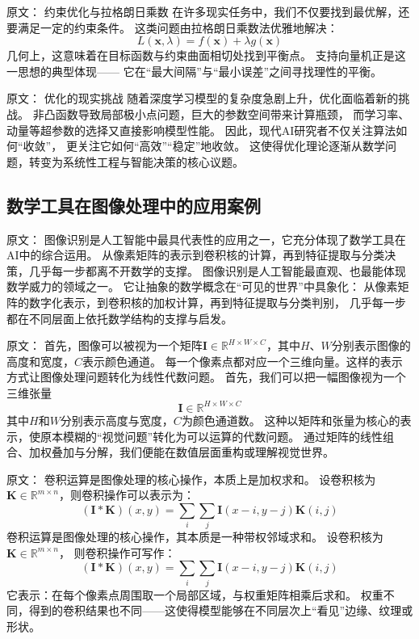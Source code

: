 原文：
约束优化与拉格朗日乘数
在许多现实任务中，我们不仅要找到最优解，还要满足一定的约束条件。  
这类问题由拉格朗日乘数法优雅地解决：
$$L(\mathbf{x}, \lambda) = f(\mathbf{x}) + \lambda g(\mathbf{x})$$  
几何上，这意味着在目标函数与约束曲面相切处找到平衡点。  
支持向量机正是这一思想的典型体现——  
它在“最大间隔”与“最小误差”之间寻找理性的平衡。



原文：
优化的现实挑战
随着深度学习模型的复杂度急剧上升，优化面临着新的挑战。  
非凸函数导致局部极小点问题，巨大的参数空间带来计算瓶颈，  
而学习率、动量等超参数的选择又直接影响模型性能。  
因此，现代AI研究者不仅关注算法如何“收敛”，  
更关注它如何“高效”“稳定”地收敛。  
这使得优化理论逐渐从数学问题，转变为系统性工程与智能决策的核心议题。


\subsection{数学工具在图像处理中的应用案例}

原文：
图像识别是人工智能中最具代表性的应用之一，它充分体现了数学工具在AI中的综合运用。  
从像素矩阵的表示到卷积核的计算，再到特征提取与分类决策，几乎每一步都离不开数学的支撑。
图像识别是人工智能最直观、也最能体现数学威力的领域之一。  
它让抽象的数学概念在“可见的世界”中具象化：  
从像素矩阵的数字化表示，到卷积核的加权计算，再到特征提取与分类判别，  
几乎每一步都在不同层面上依托数学结构的支撑与启发。



原文：
首先，图像可以被视为一个矩阵$\mathbf{I} \in \mathbb{R}^{H \times W \times C}$，其中$H$、$W$分别表示图像的高度和宽度，$C$表示颜色通道。  
每一个像素点都对应一个三维向量。这样的表示方式让图像处理问题转化为线性代数问题。
首先，我们可以把一幅图像视为一个三维张量  
$$\mathbf{I} \in \mathbb{R}^{H \times W \times C}$$  
其中$H$和$W$分别表示高度与宽度，$C$为颜色通道数。  
这种以矩阵和张量为核心的表示，使原本模糊的“视觉问题”转化为可以运算的代数问题。  
通过矩阵的线性组合、加权叠加与分解，我们便能在数值层面重构或理解视觉世界。



原文：
卷积运算是图像处理的核心操作，本质上是加权求和。  
设卷积核为$\mathbf{K} \in \mathbb{R}^{m \times n}$，则卷积操作可以表示为：
$$
(\mathbf{I} * \mathbf{K})(x, y) = \sum_i \sum_j \mathbf{I}(x-i, y-j)\mathbf{K}(i, j)
$$
卷积运算是图像处理的核心操作，其本质是一种带权邻域求和。  
设卷积核为$\mathbf{K} \in \mathbb{R}^{m \times n}$，  
则卷积操作可写作：
$$
(\mathbf{I} * \mathbf{K})(x, y) = \sum_i \sum_j \mathbf{I}(x-i, y-j)\mathbf{K}(i, j)
$$  
它表示：在每个像素点周围取一个局部区域，与权重矩阵相乘后求和。  
权重不同，得到的卷积结果也不同——这使得模型能够在不同层次上“看见”边缘、纹理或形状。



